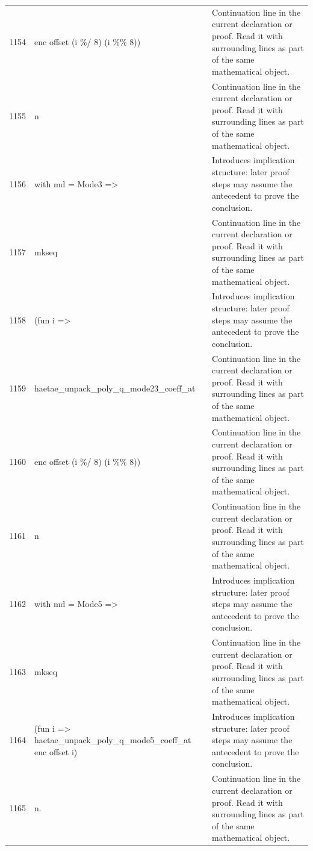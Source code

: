 \documentclass[10pt]{article}
\begin{document}
\begin{longtable}{r L{0.53\textwidth} L{0.37\textwidth}}
1154 & {\ttfamily\scriptsize           enc offset (i \%/ 8) (i \%\% 8))} & Continuation line in the current declaration or proof.  Read it with surrounding lines as part of the same mathematical object. \\
1155 & {\ttfamily\scriptsize       n} & Continuation line in the current declaration or proof.  Read it with surrounding lines as part of the same mathematical object. \\
1156 & {\ttfamily\scriptsize   with md = Mode3 =>} & Introduces implication structure: later proof steps may assume the antecedent to prove the conclusion. \\
1157 & {\ttfamily\scriptsize     mkseq} & Continuation line in the current declaration or proof.  Read it with surrounding lines as part of the same mathematical object. \\
1158 & {\ttfamily\scriptsize       (fun i =>} & Introduces implication structure: later proof steps may assume the antecedent to prove the conclusion. \\
1159 & {\ttfamily\scriptsize         haetae\_unpack\_poly\_q\_mode23\_coeff\_at} & Continuation line in the current declaration or proof.  Read it with surrounding lines as part of the same mathematical object. \\
1160 & {\ttfamily\scriptsize           enc offset (i \%/ 8) (i \%\% 8))} & Continuation line in the current declaration or proof.  Read it with surrounding lines as part of the same mathematical object. \\
1161 & {\ttfamily\scriptsize       n} & Continuation line in the current declaration or proof.  Read it with surrounding lines as part of the same mathematical object. \\
1162 & {\ttfamily\scriptsize   with md = Mode5 =>} & Introduces implication structure: later proof steps may assume the antecedent to prove the conclusion. \\
1163 & {\ttfamily\scriptsize     mkseq} & Continuation line in the current declaration or proof.  Read it with surrounding lines as part of the same mathematical object. \\
1164 & {\ttfamily\scriptsize       (fun i => haetae\_unpack\_poly\_q\_mode5\_coeff\_at enc offset i)} & Introduces implication structure: later proof steps may assume the antecedent to prove the conclusion. \\
1165 & {\ttfamily\scriptsize       n.} & Continuation line in the current declaration or proof.  Read it with surrounding lines as part of the same mathematical object. \\

\end{longtable}
\end{document}
